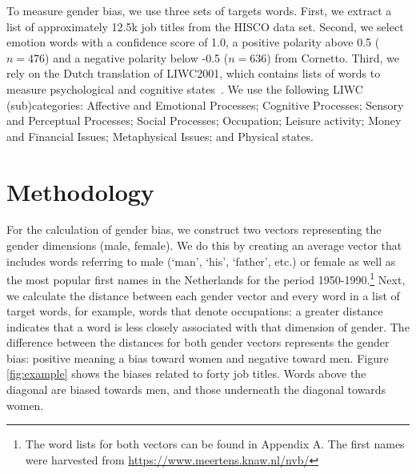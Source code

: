 \documentclass[11pt,a4paper]{article}
\begin{document}

To measure gender bias, we use three sets of targets words. First, we extract a list of approximately 12.5k job titles from the HISCO data set. Second, we select emotion words with a confidence score of 1.0, a positive polarity above 0.5 ($n = 476$) and a negative polarity below -0.5 ($n = 636$) from Cornetto. Third, we rely on the Dutch translation of LIWC2001, which contains lists of words to measure psychological and cognitive states~\cite{pennebaker2001linguistic}. We use the following LIWC (sub)categories: Affective and Emotional Processes; Cognitive Processes; Sensory and Perceptual Processes; Social Processes; Occupation; Leisure activity; Money and Financial Issues; Metaphysical Issues; and Physical states.

\section{Methodology}
For the calculation of gender bias, we construct two vectors representing the gender dimensions (male, female). We do this by creating an average vector that includes words referring to male (`man', `his', `father', etc.) or female as well as the most popular first names in the Netherlands for the period 1950-1990.\footnote{The word lists for both vectors can be found in Appendix A. The first names were harvested from \url{https://www.meertens.knaw.nl/nvb/}}
Next, we calculate the distance between each gender vector and every word in a list of target words, for example, words that denote occupations: a greater distance indicates that a word is less closely associated with that dimension of gender. The difference between the distances for both gender vectors represents the gender bias: positive meaning a bias toward women and negative toward men. Figure \ref{fig:example} shows the biases related to forty job titles. Words above the diagonal are biased towards men, and those underneath the diagonal towards women. 
\end{document}

